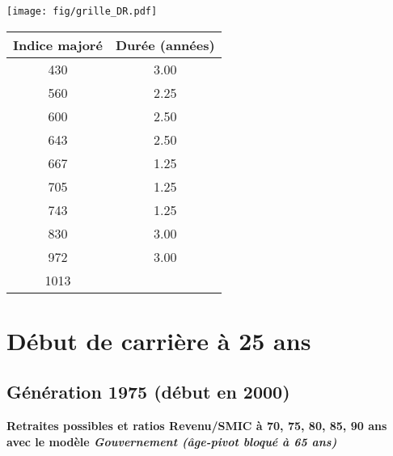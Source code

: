 \begin{minipage}{0.55\linewidth}\texttt{[image: fig/grille\_DR.pdf]}\end{minipage} 
\begin{minipage}{0.3\linewidth} 
 \begin{center} 

\begin{tabular}[htb]{|c|c|} 
\hline 
 Indice majoré &  Durée (années) \\ 
\hline \hline 
 430 &  3.00 \\ 
\hline 
 560 &  2.25 \\ 
\hline 
 600 &  2.50 \\ 
\hline 
 643 &  2.50 \\ 
\hline 
 667 &  1.25 \\ 
\hline 
 705 &  1.25 \\ 
\hline 
 743 &  1.25 \\ 
\hline 
 830 &  3.00 \\ 
\hline 
 972 &  3.00 \\ 
\hline 
 1013 &   \\ 
\hline 
\hline 
\end{tabular} 
\end{center} 
 \end{minipage} 


 \addto{\captionsenglish}{ \renewcommand{\mtctitle}{}} \setcounter{minitocdepth}{2} 
 \minitoc \newpage 

\section{Début de carrière à 25 ans} 

\subsection{Génération 1975 (début en 2000)} 

{\bf \noindent Retraites possibles et ratios Revenu/SMIC à 70, 75, 80, 85, 90 ans avec le modèle \emph{Gouvernement (âge-pivot bloqué à 65 ans)}}  
 
